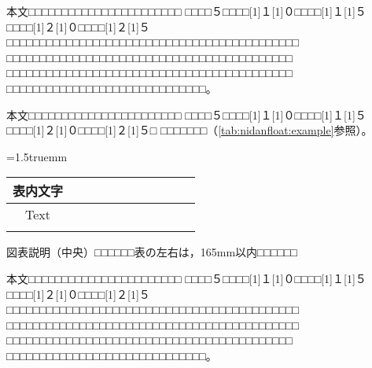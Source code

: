 \documentclass[platex,fleqn]{ieej-tec2}%
\def\tabref#1{\tablename\ref{#1}}
\begin{document}
本文□□□□□□□□□□□□□□□□□□□□□□□
□□□□５□□□□\scalebox{0.5}[1]{１}\scalebox{0.5}[1]{０}□□□□\scalebox{0.5}[1]{１}\scalebox{0.5}[1]{５}□□□□\scalebox{0.5}[1]{２}\scalebox{0.5}[1]{０}□□□□\scalebox{0.5}[1]{２}\scalebox{0.5}[1]{５}□□□□□□□□□□□□□□□□□□□□□□□□□□□□□□□□□□□□□□□□□□□□
□□□□□□□□□□□□□□□□□□□□□□□□□□□□□□□□□□□□□□□□□□□
□□□□□□□□□□□□□□□□□□□□□□□□□□□□□□□□□□□□□□□□□□□
□□□□□□□□□□□□□□□□□□□□□□□□□□□□□□。

本文□□□□□□□□□□□□□□□□□□□□□□□
□□□□５□□□□\scalebox{0.5}[1]{１}\scalebox{0.5}[1]{０}□□□□\scalebox{0.5}[1]{１}\scalebox{0.5}[1]{５}□□□□\scalebox{0.5}[1]{２}\scalebox{0.5}[1]{０}□□□□\scalebox{0.5}[1]{２}\scalebox{0.5}[1]{５}□
□□□□□□□（\tabref{tab:nidanfloat:example}参照）。

\begin{table*}[t]
\centering
\caption{タイトル}
\label{tab:nidanfloat:example}
\tabcolsep=1.5truemm
\begin{tabular}{|c|c|c|c|c|c|c|c|c|c|c|}\hline
表内文字 & \hspace{4zw} &  \hspace{4zw} &  \hspace{4zw} &  \hspace{4zw} &  \hspace{4zw} &  \hspace{4zw} &  \hspace{4zw} &  \hspace{4zw} &  \hspace{4zw} &  \hspace{4zw} \\\hline
Text & & & & & & & & & & \\\hline
& & & & & & & & & & \\\hline
\end{tabular}
\par
\begin{minipage}{\hsize}
\scriptsize\centering%
図表説明（中央）□□□□□□表の左右は，165mm以内□□□□□□
\end{minipage}
\end{table*}

本文□□□□□□□□□□□□□□□□□□□□□□□
□□□□５□□□□\scalebox{0.5}[1]{１}\scalebox{0.5}[1]{０}□□□□\scalebox{0.5}[1]{１}\scalebox{0.5}[1]{５}□□□□\scalebox{0.5}[1]{２}\scalebox{0.5}[1]{０}□□□□\scalebox{0.5}[1]{２}\scalebox{0.5}[1]{５}□□□□□□□□□□□□□□□□□□□□□□□□□□□□□□□□□□□□□□□□□□□□
□□□□□□□□□□□□□□□□□□□□□□□□□□□□□□□□□□□□□□□□□□□□
□□□□□□□□□□□□□□□□□□□□□□□□□□□□□□□□□□□□□□□□□□□
□□□□□□□□□□□□□□□□□□□□□□□□□□□□□□。
\end{document}
